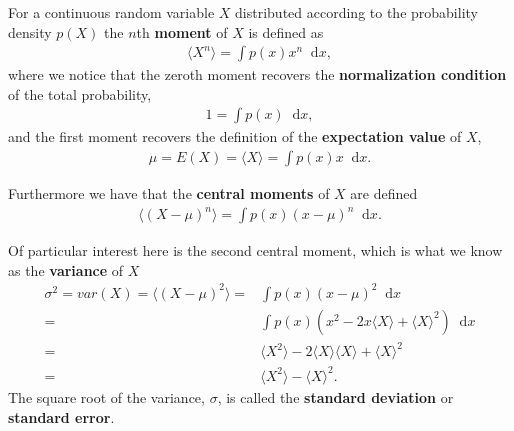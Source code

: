 \documentclass[twoside,english]{uiofysmaster}
\newcommand*\dif{\mathop{}\!\mathrm{d}}
\begin{document}
For a continuous random variable $X$ distributed according to the probability density $p(X)$ the $n$th \textbf{moment} of $X$ is defined as
\begin{align}
	\langle X^n \rangle = \int p(x) x^n \dif x ,
\end{align}
where we notice that the zeroth moment recovers the \textbf{normalization condition} of the total probability,
\begin{align}
	1 = \int p(x) \dif x ,
\end{align}
and the first moment recovers the definition of the \textbf{expectation value} of $X$, 
\begin{align}
	\mu = E(X) = \langle X \rangle = \int p(x) x \dif x .
\end{align}


Furthermore we have that the \textbf{central moments} of $X$ are defined
\begin{align}
	\langle (X-\mu)^n \rangle = \int p(x) (x - \mu)^n \dif x .
\end{align}

Of particular interest here is the second central moment, which is what we know as the \textbf{variance} of $X$
\begin{align}
	\sigma^2 = var(X) = \langle (X-\mu)^2 \rangle =& \int p(x) (x - \mu)^2 \dif x  \\
	=& \int p(x) (x^2 - 2x \langle X \rangle + \langle X \rangle^2) \dif x \\
	=& \langle X^2 \rangle - 2\langle X \rangle \langle X \rangle + \langle X \rangle^2  \\
	=& \langle X^2 \rangle - \langle X \rangle^2.
\end{align}
The square root of the variance, $\sigma$, is called the \textbf{standard deviation} or \textbf{standard error}. 
\end{document}
